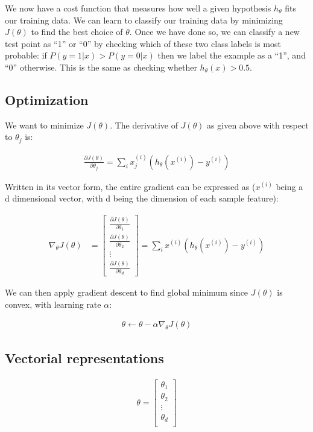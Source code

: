 We now have a cost function that measures how well a given hypothesis $h_\theta$ fits our training data. We can learn to classify our training data by minimizing $J(\theta)$ to find the best choice of $\theta$. Once we have done so, we can classify a new test point as “1” or “0” by checking which of these two class labels is most probable: if $P(y=1|x) > P(y=0|x)$ then we label the example as a “1”, and “0” otherwise. This is the same as checking whether $h_\theta(x) > 0.5$.

\subsection{Optimization}
We want to minimize $J(\theta)$. The derivative of $J(\theta)$ as given above with respect to $\theta_j$ is:

\begin{align}
	\frac{\partial J(\theta)}{\partial \theta_j} = \sum_i x^{(i)}_j (h_\theta(x^{(i)}) - y^{(i)})
\end{align}

Written in its vector form, the entire gradient can be expressed as ($x^{(i)}$ being a d dimensional vector, with d being the dimension of each sample feature):

\begin{align}
	\nabla_\theta J(\theta) 
	&= 
	\begin{bmatrix}
		\frac{\partial J(\theta)}{\partial \theta_1}\\
		\frac{\partial J(\theta)}{\partial \theta_2}\\
		\vdots\\
		\frac{\partial J(\theta)}{\partial \theta_d}
	\end{bmatrix}
	=
		\sum_i x^{(i)} (h_\theta(x^{(i)}) - y^{(i)})
\end{align}

We can then apply gradient descent to find global minimum since $J(\theta)$ is convex, with learning rate $\alpha$:

\begin{align}
	\theta \leftarrow \theta - \alpha \nabla_\theta J(\theta)
\end{align}

\subsection{Vectorial representations}
\begin{align}
	\theta = \left[
	\begin{array}{cccc}
		\theta_{1} \\
		\theta_{2} \\
		\vdots\\
		\theta_{d} \\
	\end{array}\right]
\end{align}

